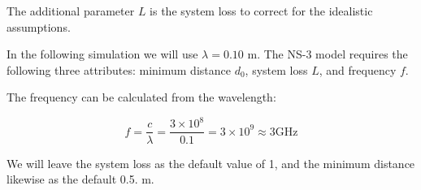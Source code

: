 \documentclass[11pt,journal]{article}
\begin{document}
	The additional parameter $L$ is the system loss to correct for the idealistic assumptions.
	
	In the following simulation we will use $\lambda = 0.10$ m. The NS-3 model requires the following three attributes: minimum distance $d_0$, system loss $L$, and frequency $f$.
	
	The frequency can be calculated from the wavelength:
	
	\[ f = \dfrac{c}{\lambda} =  \dfrac{3\times 10^8}{0.1}= 3 \times 10^9 \approx 3 \text{GHz} \]
	
	We will leave the system loss as the default value of 1, and the minimum distance likewise as the default 0.5. m.
	
	
	

	
\end{document}

